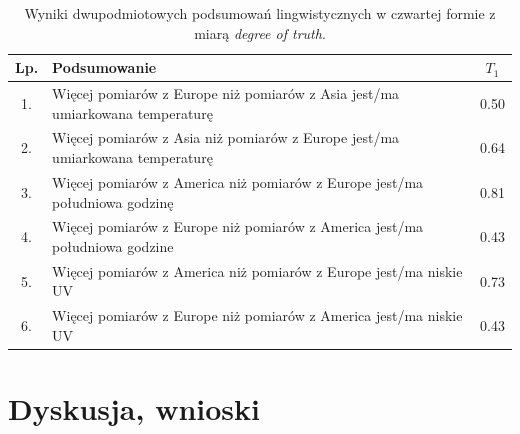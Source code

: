 \documentclass{article}
\begin{document}
\begin{table}[H]
\begin{center}
\normalsize %
\begin{tabular}{|c|p{10cm}|c|} %
\hline
\textbf{Lp.} & \textbf{Podsumowanie} & \textbf{\(T_1\)} \\ \hline
1. & Więcej pomiarów z Europe niż pomiarów z Asia jest/ma umiarkowana temperaturę & 0.50 \\\hline
2. & Więcej pomiarów z Asia niż pomiarów z Europe jest/ma umiarkowana temperaturę & 0.64 \\\hline
3. & Więcej pomiarów z America niż pomiarów z Europe jest/ma południowa godzinę & 0.81 \\\hline
4. & Więcej pomiarów z Europe niż pomiarów z America jest/ma południowa godzine & 0.43 \\\hline
5. & Więcej pomiarów z America niż pomiarów z Europe jest/ma niskie UV & 0.73 \\\hline
6. & Więcej pomiarów z Europe niż pomiarów z America jest/ma niskie UV & 0.43 \\\hline 
\end{tabular}
\caption{Wyniki dwupodmiotowych podsumowań lingwistycznych w czwartej formie z miarą \textit{degree of truth}.}
\end{center}
\end{table}

\section{Dyskusja, wnioski}
\end{document}
